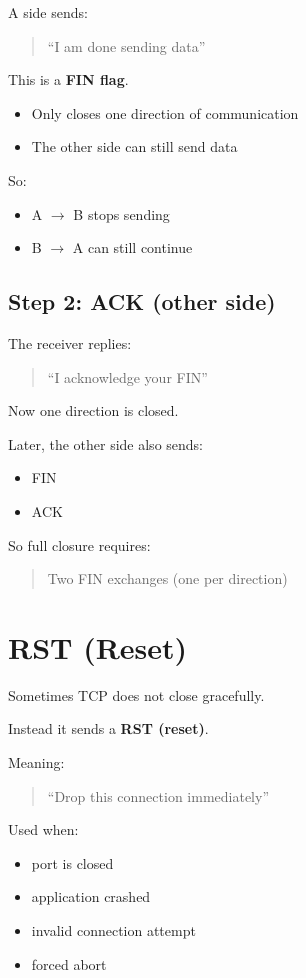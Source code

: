 A side sends:

\begin{quote}
“I am done sending data”
\end{quote}

This is a \textbf{FIN flag}.

\begin{itemize}
    \item Only closes one direction of communication
    \item The other side can still send data
\end{itemize}

So:
\begin{itemize}
    \item A $\rightarrow$ B stops sending
    \item B $\rightarrow$ A can still continue
\end{itemize}

\subsection{Step 2: ACK (other side)}

The receiver replies:

\begin{quote}
“I acknowledge your FIN”
\end{quote}

Now one direction is closed.

Later, the other side also sends:
\begin{itemize}
    \item FIN
    \item ACK
\end{itemize}

So full closure requires:
\begin{quote}
Two FIN exchanges (one per direction)
\end{quote}

\section{RST (Reset)}

Sometimes TCP does not close gracefully.

Instead it sends a \textbf{RST (reset)}.

Meaning:
\begin{quote}
“Drop this connection immediately”
\end{quote}

Used when:
\begin{itemize}
    \item port is closed
    \item application crashed
    \item invalid connection attempt
    \item forced abort
\end{itemize}
\clearpage
